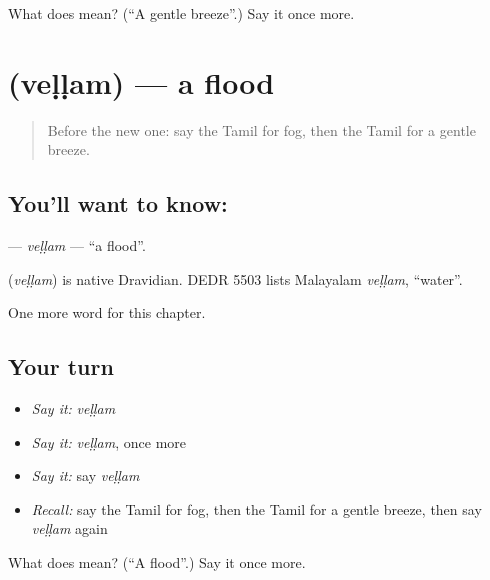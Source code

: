 \begin{tcolorbox}[breakable,colback=teal!4,colframe=teal!35!black,title={Before you move on}]
What does  mean? (\textquotedblleft{}A gentle breeze\textquotedblright{}.) Say it once more.
\end{tcolorbox}
\section[\texorpdfstring{\ta{வெள்ளம்} (veḷḷam)}{வெள்ளம் (veḷḷam)}]{ (veḷḷam) — a flood}

\label{lesson:TA-C219-vellam}



\begin{quote}
Before the new one: say the Tamil for fog, then the Tamil for a gentle breeze.
\end{quote}

\subsection*{You'll want to know: }
\textbf{} — \emph{veḷḷam} — \textquotedblleft{}a flood\textquotedblright{}.

\begin{cousinweb}
\textbf{} (\emph{veḷḷam}) is native Dravidian. DEDR 5503 lists Malayalam \emph{veḷḷam}, \textquotedblleft{}water\textquotedblright{}.
\end{cousinweb}

\begin{grammarlens}[title={What you've built}]
One more word for this chapter.
\end{grammarlens}

\subsection*{Your turn}
\begin{itemize}
\raggedright
  \item \emph{Say it:} \emph{veḷḷam}
  \item \emph{Say it:} \emph{veḷḷam}, once more
  \item \emph{Say it:} say \emph{veḷḷam}
  \item \emph{Recall:} say the Tamil for fog, then the Tamil for a gentle breeze, then say \emph{veḷḷam} again
\end{itemize}

\begin{tcolorbox}[breakable,colback=teal!4,colframe=teal!35!black,title={Before you move on}]
What does  mean? (\textquotedblleft{}A flood\textquotedblright{}.) Say it once more.
\end{tcolorbox}

